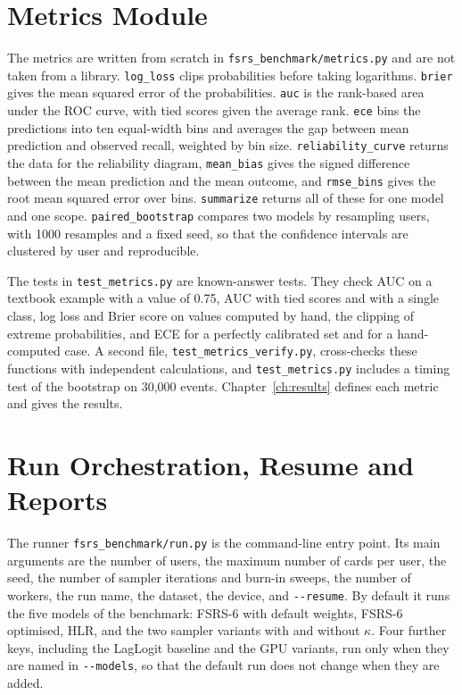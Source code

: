 \section{Metrics Module}
\label{sec:impl-metrics}

The metrics are written from scratch in \texttt{fsrs\_benchmark/\allowbreak metrics.py} and are not taken from a
library. \texttt{log\_loss} clips probabilities before taking logarithms. \texttt{brier} gives the mean squared
error of the probabilities. \texttt{auc} is the rank-based area under the ROC curve, with tied scores given
the average rank. \texttt{ece} bins the predictions into ten equal-width bins and averages the gap between
mean prediction and observed recall, weighted by bin size. \texttt{reliability\_curve} returns the data
for the reliability diagram, \texttt{mean\_bias} gives the signed difference between the mean prediction and
the mean outcome, and \texttt{rmse\_bins} gives the root mean squared error over bins. \texttt{summarize}
returns all of these for one model and one scope. \texttt{paired\_bootstrap} compares two models by
resampling users, with 1000 resamples and a fixed seed, so that the confidence intervals are clustered by
user and reproducible.

The tests in \texttt{test\_metrics.py} are known-answer tests. They check AUC on a textbook example with a
value of 0.75, AUC with tied scores and with a single class, log loss and Brier score on values computed
by hand, the clipping of extreme probabilities, and ECE for a perfectly calibrated set and for a hand-computed
case. A second file, \texttt{test\_metrics\_verify.py}, cross-checks these functions with independent calculations, and \texttt{test\_metrics.py} includes a timing test of the bootstrap on 30,000 events. Chapter~\ref{ch:results} defines each
metric and gives the results.

\section{Run Orchestration, Resume and Reports}
\label{sec:impl-orchestration}

The runner \texttt{fsrs\_benchmark/\allowbreak run.py} is the command-line entry point. Its main arguments are the number
of users, the maximum number of cards per user, the seed, the number of sampler iterations and burn-in
sweeps, the number of workers, the run name, the dataset, the device, and \texttt{-{}-resume}. By default it
runs the five models of the benchmark: FSRS-6 with default weights, FSRS-6 optimised, HLR, and the two
sampler variants with and without $\kappa$. Four further keys, including the LagLogit baseline and the GPU
variants, run only when they are named in \texttt{-{}-models}, so that the default run does not change when
they are added.


